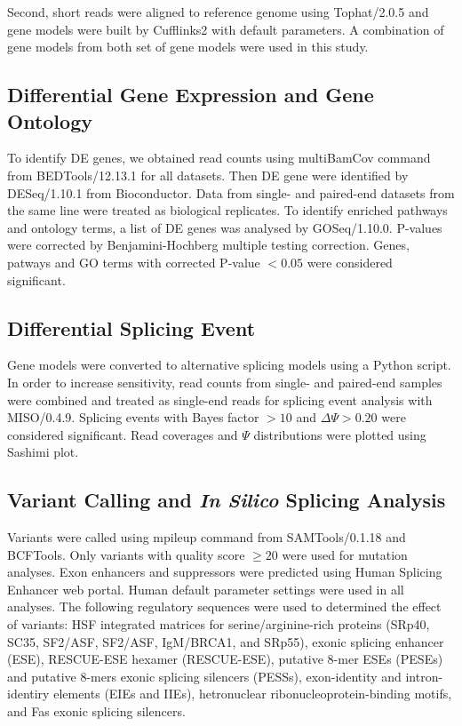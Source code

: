 \documentclass[10pt]{article}
\begin{document}
Second, short reads were aligned to reference genome using Tophat/2.0.5\cite{} and 
gene models were built by Cufflinks2\cite{} with default parameters.
A combination of gene models from both set of gene models were used in this study.

\subsection{Differential Gene Expression and Gene Ontology}

To identify DE genes, we obtained read counts using multiBamCov command from BEDTools/12.13.1\cite{}
for all datasets.
Then DE gene were identified by DESeq/1.10.1\cite{S:2010fu} from Bioconductor.
Data from single- and paired-end datasets from the same line were treated as biological replicates.
To identify enriched pathways and ontology terms, a list of DE genes was analysed by GOSeq/1.10.0\cite{}.
P-values were corrected by Benjamini-Hochberg multiple testing correction.
Genes, patways and GO terms with corrected P-value $<0.05$ were considered significant.

\subsection{Differential Splicing Event}
Gene models were converted to alternative splicing models using a Python script.
In order to increase sensitivity, read counts from single- and paired-end samples were combined and treated
as single-end reads for splicing event analysis with MISO/0.4.9\cite{Katz:2010iv}.
Splicing events with Bayes factor $>10$ and $\Delta\Psi>0.20$ were considered significant.
Read coverages and $\Psi$ distributions were plotted using Sashimi plot\cite{Katz:2013vx}.

\subsection{Variant Calling and \emph{In Silico} Splicing Analysis}
Variants were called using mpileup command from SAMTools/0.1.18\cite{} and BCFTools\cite{}.
Only variants with quality score $\ge20$ were used for mutation analyses.
Exon enhancers and suppressors were predicted using Human Splicing Enhancer web portal\cite{}.
Human default parameter settings were used in all analyses.
The following regulatory sequences were used to determined the effect of variants:
HSF integrated matrices for serine/arginine-rich proteins (SRp40, SC35, SF2/ASF, SF2/ASF,
IgM/BRCA1, and SRp55), exonic splicing enhancer (ESE), RESCUE-ESE hexamer (RESCUE-ESE),
putative 8-mer ESEs (PESEs) and putative 8-mers exonic splicing silencers (PESSs),
exon-identity and intron-identiry elements (EIEs and IIEs), hetronuclear ribonucleoprotein-binding
motifs, and Fas exonic splicing silencers.
\end{document}
